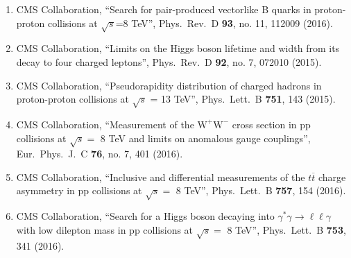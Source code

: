 \begin{itemize}
\begin{enumerate}
\item CMS Collaboration, ``Search for pair-produced vectorlike B quarks in proton-proton collisions at $\sqrt{s}$=8 TeV'', Phys.\ Rev.\ D {\bf 93}, no. 11, 112009 (2016).

\item CMS Collaboration, ``Limits on the Higgs boson lifetime and width from its decay to four charged leptons'', Phys.\ Rev.\ D {\bf 92}, no. 7, 072010 (2015).

\item CMS Collaboration, ``Pseudorapidity distribution of charged hadrons in proton-proton collisions at $\sqrt{s}$ = 13 TeV'', Phys.\ Lett.\ B {\bf 751}, 143 (2015).

\item CMS Collaboration, ``Measurement of the ${{\mathrm{W} }^{+} }\mathrm{W}^{-} $ cross section in pp collisions at $\sqrt{s} =$ 8 TeV and limits on anomalous gauge couplings'', Eur.\ Phys.\ J.\ C {\bf 76}, no. 7, 401 (2016).

\item CMS Collaboration, ``Inclusive and differential measurements of the $t\overline{t}$ charge asymmetry in pp collisions at $\sqrt{s} =$ 8 TeV'', Phys.\ Lett.\ B {\bf 757}, 154 (2016).

\item CMS Collaboration, ``Search for a Higgs boson decaying into $\gamma^* \gamma \to \ell \ell \gamma$ with low dilepton mass in pp collisions at $\sqrt s = $ 8 TeV'', Phys.\ Lett.\ B {\bf 753}, 341 (2016).


\end{enumerate}
\end{itemize}
